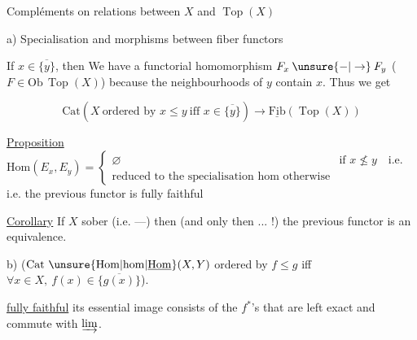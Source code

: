 Compléments on relations between $X$ and $\operatorname{Top}(X)$

a) Specialisation and morphisms between fiber functors

If $x\in\overline{\{y\}}$, then We have a functorial homomorphism
$F_x\mathbin{\unsure{-|\to}}F_y$ ($F\in\mathrm{Ob}\,\operatorname{Top}(X)$) because the neighbourhoods of
$y$ contain $x$. Thus  we get 

\[
\mathrm{Cat}(X\ \text{ordered by }x\leq y\ \text{iff }x\in\overline{\{y\}})\longrightarrow
\underline{\mathrm{Fib}}(\operatorname{Top}(X))
\]

\uline{Proposition} $\mathrm{Hom}(E_x,E_y)=\left\{\begin{array}{ll}\varnothing&\text{if }x\nleq y\quad\text{i.e.}\\\text{reduced to the specialisation hom otherwise}\end{array}\right.$
i.e. the previous functor is fully faithful

\uline{Corollary} If $X$ sober   (i.e. ---)
then (and only then ... !) the previous functor is an equivalence.


b) ($\mathrm{Cat}\ \unsure{\mathrm{Hom}|\mathrm{hom}|\underline{\mathrm{Hom}}}(X,Y)$ ordered by $f\leq g$ iff $\forall x\in X,\ f(x)\in\overline{\{g(x)\}}$).




\uline{fully faithful} 
its essential image consists of the $f^{*}$'s that are
left exact and commute with $\varinjlim$. 

